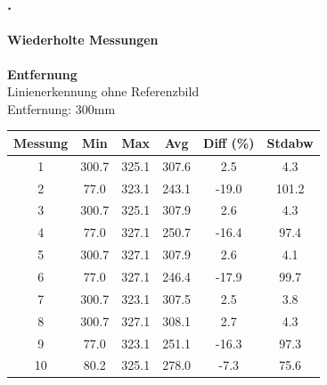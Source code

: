 \documentclass[xcolor=dvipsnames]{beamer}
\def\frametitlesec{\frametitle{\arabic{section}.\hspace{0.5ex}\insertsection}}
\def\framesubtitles#1{\framesubtitle{\hspace{3.5ex}#1}}
\begin{document}
\begin{frame}
	\frametitlesec
	\framesubtitles{Wiederholte Messungen}
		\textbf{Entfernung}\\
	
		Linienerkennung ohne Referenzbild\\
		Entfernung: 300mm
		
		\begin{tabular}{c|c|c|c|c|c}
			Messung & Min & Max & Avg & Diff (\%) & Stdabw \\ \hline
1 & 300.7 & 325.1 & 307.6 & 2.5 & 4.3\\
2 & 77.0 & 323.1 & 243.1 & -19.0 & 101.2\\
3 & 300.7 & 325.1 & 307.9 & 2.6 & 4.3\\
4 & 77.0 & 327.1 & 250.7 & -16.4 & 97.4\\
5 & 300.7 & 327.1 & 307.9 & 2.6 & 4.1\\
6 & 77.0 & 327.1 & 246.4 & -17.9 & 99.7\\
7 & 300.7 & 323.1 & 307.5 & 2.5 & 3.8\\
8 & 300.7 & 327.1 & 308.1 & 2.7 & 4.3\\
9 & 77.0 & 323.1 & 251.1 & -16.3 & 97.3\\
10 & 80.2 & 325.1 & 278.0 & -7.3 & 75.6
		\end{tabular}
	
\end{frame}
\end{document}

